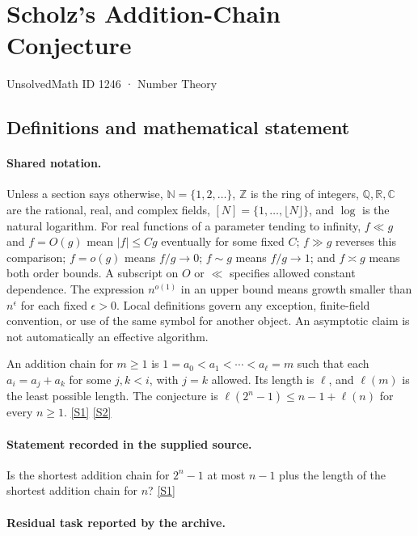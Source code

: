 \documentclass[11pt,a4paper]{article}
\newcommand{\N}{\mathbb{N}}
\newcommand{\Z}{\mathbb{Z}}
\newcommand{\Q}{\mathbb{Q}}
\newcommand{\R}{\mathbb{R}}
\newcommand{\C}{\mathbb{C}}
\newcommand{\sref}[2]{\hyperlink{source:#1:#2}{[S#2]}}
\begin{document}

\setcounter{section}{1245}

\section{Scholz's Addition-Chain Conjecture}\label{1246}

{\small\sffamily UnsolvedMath ID 1246 · Number Theory}

\subsection{Definitions and mathematical statement}

\paragraph{Shared notation.}Unless a section says otherwise, $\N=\{1,2,\ldots\}$,
$\Z$ is the ring of integers, $\Q,\R,\C$ are the rational, real, and complex
fields, $[N]=\{1,\ldots,\lfloor N\rfloor\}$, and $\log$ is the natural
logarithm. For real functions of a parameter tending to infinity,
$f\ll g$ and $f=O(g)$ mean $|f|\leq Cg$ eventually for some fixed $C$;
$f\gg g$ reverses this comparison; $f=o(g)$ means $f/g\to0$;
$f\sim g$ means $f/g\to1$; and $f\asymp g$ means both order bounds.
A subscript on $O$ or $\ll$ specifies allowed constant dependence.
The expression $n^{o(1)}$ in an upper bound means growth smaller than
$n^\epsilon$ for each fixed $\epsilon>0$. Local definitions govern any
exception, finite-field convention, or use of the same symbol for another
object. An asymptotic claim is not automatically an effective algorithm.



An addition chain for $m\geq1$ is $1=a_0<a_1<\cdots<a_\ell=m$ such that each $a_i=a_j+a_k$ for some $j,k<i$, with $j=k$ allowed. Its length is $\ell$, and $\ell(m)$ is the least possible length. The conjecture is $\ell(2^n-1)\leq n-1+\ell(n)$ for every $n\geq1$. \sref{1246}{1} \sref{1246}{2}

\paragraph{Statement recorded in the supplied source.}
Is the shortest addition chain for $2^n - 1$ at most $n - 1$ plus the length of the shortest addition chain for $n$? \sref{1246}{1}

\paragraph{Residual task reported by the archive.}
\end{document}
